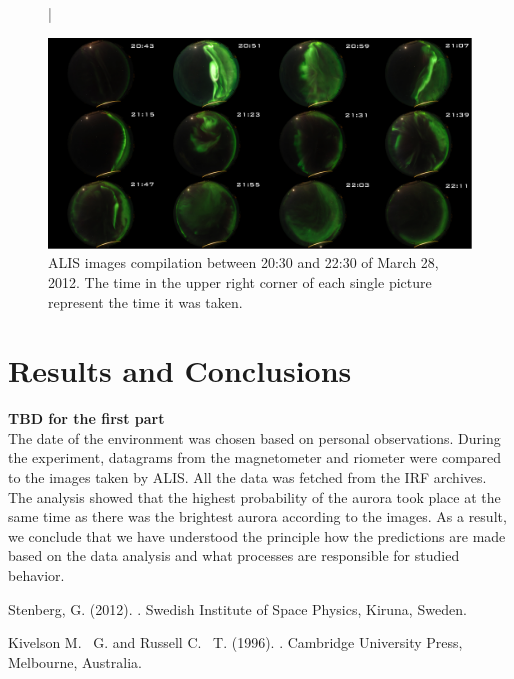 \documentclass{article}
\begin{document}
\begin{figure}[htbp!]
\centering|
\centerline{\includegraphics[width=1.5\textwidth]{Figures/awowa.png}}
\caption{ALIS images compilation between 20:30 and 22:30 of March 28, 2012. The time in the upper right corner of each single picture represent the time it was taken.}
\label{fig:ALIS}
\end{figure}



\section{Results and Conclusions}

\textbf{TBD for the first part}
\\
The date of the environment was chosen based on personal observations. During the experiment, datagrams from the magnetometer and riometer were compared to the images taken by ALIS. All the data was fetched from the IRF archives. The analysis showed that the highest probability of the aurora took place at the same time as there was the brightest aurora according to the images. As a result, we conclude that we have understood the principle how the predictions are made based on the data analysis and what processes are responsible for studied behavior.


\begin{thebibliography}{9}

Stenberg, G.  (2012).
.
\newblock Swedish Institute of Space Physics, Kiruna, Sweden.

Kivelson M. ~G. and Russell C. ~T.  (1996).
.
\newblock Cambridge University Press, Melbourne, Australia.

\end{thebibliography}
\end{document}
